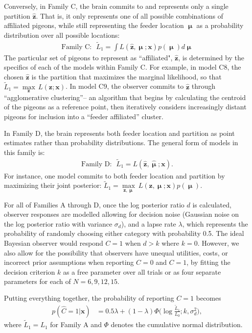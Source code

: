 \documentclass{article}
\newcommand{\mu}{\boldsymbol\upmu}
\begin{document}
Conversely, in Family C, the brain commits to and represents only a single partition $\hat{\mathbf{z}}$. That is, it only represents one of all possible combinations of affiliated pigeons, while still representing the feeder location $\mu$ as a probability distribution over all possible locations:
\begin{align*}
       \text{Family C:~~}   \tilde{L}_1
    = \int L(\mathbf{\hat{z}},\mu;\mathbf{x})p(\mu)d\mu
\end{align*}
The particular set of pigeons to represent as ``affiliated", $\hat{\mathbf{z}}$, is determined by the specifics of each of the models within Family C. For example, in model C8, the chosen $\hat{\mathbf{z}}$ is the partition that maximizes the marginal likelihood, so that $\tilde{L}_1 = \underset{\mathbf{z}}{\max}\,L(\mathbf{z};\mathbf{x})$. In model C9, the observer commits to $\hat{\mathbf{z}}$ through ``agglomerative clustering''-- an algorithm that begins by calculating the centroid of the pigeons as a reference point, then iteratively considers increasingly distant pigeons for inclusion into a ``feeder affiliated'' cluster. 



In Family D, the brain represents both feeder location and partition as point estimates rather than probability distributions. The general form of models in this family is:
\begin{align*}
        \text{Family D:~~}    \tilde{L}_1  = L(\mathbf{\hat{z}}, \hat{\mu};\mathbf{x}).
\end{align*}
For instance, one model commits to both feeder location and partition by maximizing their joint posterior: $\tilde{L}_1 = \underset{\mathbf{z},\mu}{\max}~L(\mathbf{z},\mu;\mathbf{x})p(\mu)$.

For all of Families A through D, once the log posterior ratio $d$ is calculated, observer responses are modelled allowing for decision noise (Gaussian noise on the log posterior ratio with variance $\sigma_d$), and a lapse rate $\lambda$, which represents the probability of randomly choosing either category with probability 0.5. The ideal Bayesian observer would respond $C=1$ when $d > k$ where $k=0$. However, we also allow for the possibility that observers have unequal utilities, costs, or incorrect prior assumptions when reporting  $C=0$ and $C=1$, by fitting the decision criterion $k$ as a free parameter over all trials or as four separate parameters for each of $N = 6, 9, 12, 15$.

Putting everything together, the probability of reporting $C=1$ becomes
\begin{align}
    p(\hat{C} = 1|\mathbf{x}) &= 0.5\lambda + (1-\lambda) \Phi\Big(\log \frac{\tilde{L}_1}{L_0}; k, \sigma_d^2\Big),
\end{align}
where $\tilde{L}_1 = L_1$ for Family A and $\Phi$ denotes the cumulative normal distribution.
\end{document}
